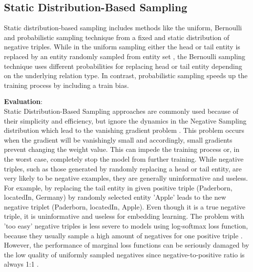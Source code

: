 \subsection{Static Distribution-Based Sampling}
\label{subsec:static_distribution_based_sampling}

Static distribution-based sampling includes methods like the uniform, Bernoulli and probabilistic sampling technique from a fixed and static distribution of negative triples.
While in the uniform sampling either the head or tail entity is replaced by an entity randomly sampled from entity set \entities,
the Bernoulli sampling technique uses different probabilities for replacing head or tail entity depending on the underlying relation type.
In contrast, probabilistic sampling speeds up the training process by including a train bias.
	
\textbf{Evaluation}:\\
Static Distribution-Based Sampling approaches are commonly used because of their simplicity and efficiency, but ignore the dynamics in the Negative Sampling distribution which lead to the vanishing gradient problem \cite{qianunderstanding}.
This problem occurs when the gradient will be vanishingly small and accordingly, small gradients prevent changing the weight value.
This can impede the training process or, in the worst case, completely stop the model from further training.
While negative triples, such as those generated by randomly replacing a head or tail entity, are very likely to be negative examples, they are generally uninformative and useless.
For example, by replacing the tail entity in given positive triple (Paderborn, locatedIn, Germany) by randomly selected entity 'Apple' leads to the new negative triplet (Paderborn, locatedIn, Apple).
Even though it is a true negative triple, it is uninformative and useless for embedding learning.
The problem with 'too easy' negative triples is less severe to models using log-softmax loss function, because they usually sample a high amount of negatives for one positive triple \cite{cai2017kbgan}.
However, the performance of marginal loss functions can be seriously damaged by the low quality of uniformly sampled negatives since negative-to-positive ratio is always 1:1 \cite{cai2017kbgan}.